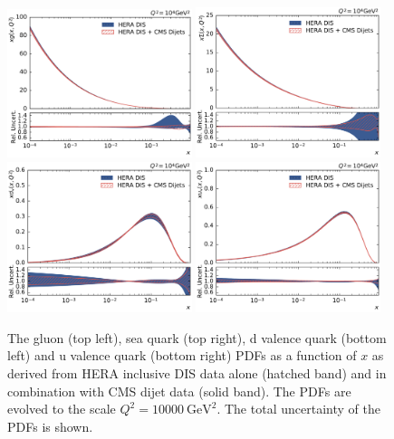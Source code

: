 \begin{figure}[tbp]
  \centering
  \includegraphics[width=0.48\textwidth]{figures/pdf_constraints/pdfcomp_direct_0_10000.pdf}\hfill%
  \includegraphics[width=0.48\textwidth]{figures/pdf_constraints/pdfcomp_direct_9_10000.pdf}
  \includegraphics[width=0.48\textwidth]{figures/pdf_constraints/pdfcomp_direct_7_10000.pdf}\hfill%
  \includegraphics[width=0.48\textwidth]{figures/pdf_constraints/pdfcomp_direct_8_10000.pdf}
  \caption[Direct comparison of gluon and quark PDFs]{The gluon (top left), sea
  quark (top right), d valence quark (bottom left) and u valence quark (bottom
right) PDFs as a function of $x$ as derived from HERA inclusive DIS data
alone (hatched band) and in combination with CMS dijet data (solid band). The PDFs
are evolved to the scale $Q^2 = \SI{10000}{\GeV \squared}$. The total
uncertainty of the PDFs is shown.}
\label{fig:pdfconstraints:direct:10000}
\end{figure}

